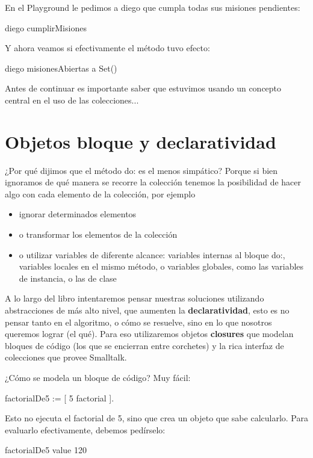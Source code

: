 \documentclass[a4paper,12pt]{book}
\begin{document}
En el Playground le pedimos a diego que cumpla todas sus misiones pendientes:

\begin{code}
diego cumplirMisiones
\end{code}

Y ahora veamos si efectivamente el método tuvo efecto:

\begin{code}
diego misionesAbiertas
      a Set()
\end{code}

Antes de continuar es importante saber que estuvimos usando un concepto central en el uso de las colecciones...
\\

\section{Objetos bloque y declaratividad}
¿Por qué dijimos que el método do: es el menos simpático? Porque si bien ignoramos de qué manera se recorre la
colección tenemos la posibilidad de hacer algo con cada elemento de la colección, por ejemplo
\begin{itemize}
 \item ignorar determinados elementos
 \item o transformar los elementos de la colección
 \item o utilizar variables de diferente alcance: variables internas al bloque do:, variables locales en el mismo
 método, o variables globales, como las variables de instancia, o las de clase
\end{itemize}
A lo largo del libro intentaremos pensar nuestras soluciones utilizando abstracciones de más alto nivel, 
que aumenten la \textbf{declaratividad}, esto es no pensar tanto en el algoritmo, o cómo se resuelve, 
sino en lo que nosotros queremos lograr (el qué). Para eso utilizaremos objetos \textbf{closures} que
modelan bloques de código  (los que se encierran entre corchetes) y la rica interfaz de colecciones que
provee Smalltalk.

¿Cómo se modela un bloque de código? Muy fácil:

\begin{code}
factorialDe5 := [ 5 factorial ].
\end{code}

Esto no ejecuta el factorial de 5, sino que crea un objeto que sabe calcularlo. Para evaluarlo efectivamente, 
debemos pedírselo:

\begin{code}
factorialDe5 value
    120
\end{code}
\end{document}

